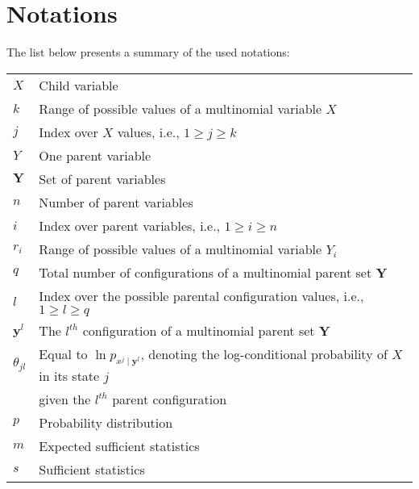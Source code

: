 \documentclass[11pt, oneside]{article}   	%
\numberwithin{figure}{section}
\numberwithin{equation}{section}
\numberwithin{table}{section}
\begin{document}
\section*{Notations}

The list below presents a summary of the used notations:
\\

\begin{table}[ht!]
\renewcommand{\arraystretch}{1.1}
{\small
\begin{tabular}{l l}
$X$ & Child variable\\
$k$& Range of possible values of a multinomial variable $X$\\
$j$ & Index over $X$ values, i.e., $1 \geq j \geq k$ \\
$Y$ & One parent variable\\
$\mathbf{Y}$ & Set of parent variables\\
$n$& Number of parent variables \\
$i$ & Index over parent variables, i.e., $1 \geq i \geq n$ \\
$r_i$& Range of possible values of a multinomial variable $Y_i$\\
$q $ & Total number of configurations of a multinomial parent set $\mathbf{Y}$\\
$l$ & Index over the possible parental configuration values, i.e., $1 \geq l \geq q$ \\
$\mathbf{y}^l$ & The $l^{th}$ configuration of a multinomial parent set $\mathbf{Y}$\\
$\theta_{jl}$ & Equal to $\ln p_{x^j\mid \mathbf{y}^l}$, denoting the log-conditional probability of $X$ in its state $j$ \\
                    & given the $l^{th}$ parent configuration\\
$p$ & Probability distribution\\
$m$ & Expected sufficient statistics \\
$s$ & Sufficient statistics \\
\end{tabular}}
\end{table}
\end{document}

